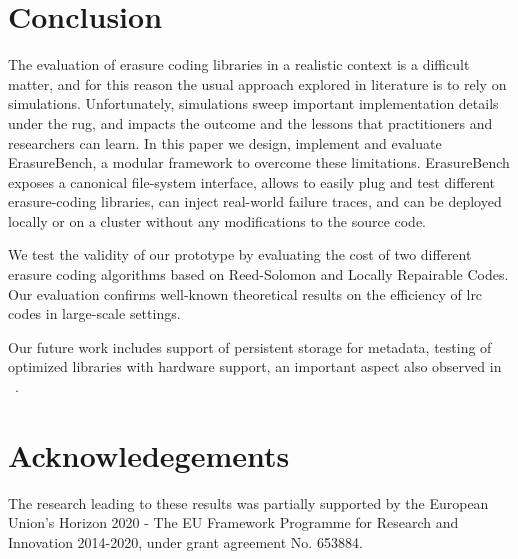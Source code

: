 \vspace{-0.5mm}
\section{Conclusion}
\label{sec:conclusion}
The evaluation of erasure coding libraries in a realistic context is a difficult matter, and for this reason the usual approach explored in literature is to rely on simulations.
Unfortunately, simulations sweep important implementation details under the rug, and impacts the outcome and the lessons that practitioners and researchers can learn. In this paper we design, implement and evaluate ErasureBench, a modular framework to overcome these limitations.
ErasureBench exposes a canonical file-system interface, allows to easily plug and test different erasure-coding libraries, can inject real-world failure traces, and can be deployed locally or on a cluster without any modifications to the source code.

We test the validity of our prototype by evaluating the cost of two different erasure coding algorithms based on Reed-Solomon and Locally Repairable Codes. 
Our evaluation confirms well-known theoretical results on the efficiency of \ac{lrc} codes in large-scale settings.  

Our future work includes support of persistent storage for metadata, testing of optimized libraries with hardware support, an important aspect also observed in ~\cite{Burihabwa2016}.

\section{Acknowledegements}
The research leading to these results was partially supported by the European Union's Horizon 2020 -  The EU Framework Programme for Research and Innovation 2014-2020, under grant agreement No. 653884.